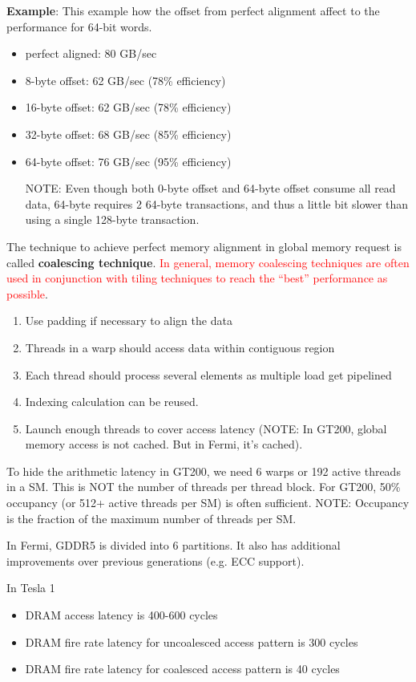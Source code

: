 {\bf Example}: This example how the offset from perfect alignment
affect to the performance for 64-bit words.
\begin{itemize}
\item perfect aligned: 80 GB/sec
\item 8-byte offset: 62 GB/sec (78\% efficiency)
\item 16-byte offset: 62 GB/sec (78\% efficiency)
\item 32-byte offset: 68 GB/sec (85\% efficiency)
\item 64-byte offset: 76 GB/sec (95\% efficiency)

  NOTE: Even though both 0-byte offset and 64-byte offset consume all
  read data, 64-byte requires 2 64-byte transactions, and thus a little bit
  slower than using a single 128-byte transaction.
\end{itemize}

The technique to achieve perfect memory alignment in global memory
request is called {\bf coalescing technique}.
\textcolor{red}{In general, memory coalescing techniques are often
  used in conjunction with tiling techniques to reach the ``best''
  performance as possible}.
\begin{enumerate}
\item Use padding if necessary to align the data
\item Threads in a warp should access data within contiguous region
\item Each thread should process several elements as multiple load get
  pipelined
\item Indexing calculation can be reused. 
\item Launch enough threads to cover access latency (NOTE: In GT200,
  global memory access is not cached. But in Fermi, it's cached). 
\end{enumerate}


To hide the arithmetic latency in GT200, we need 6 warps or 192 active
threads in a SM. This is NOT the number of threads per thread
block. For GT200, 50\% occupancy (or 512+ active threads per SM) is
often sufficient. NOTE: Occupancy is the fraction of the maximum
number of threads per SM.

In Fermi, GDDR5 is divided into 6 partitions. It also has additional
improvements over previous generations (e.g. ECC support). 

In Tesla 1
\begin{itemize}
\item DRAM access latency is 400-600 cycles
\item DRAM fire rate latency for uncoalesced access pattern is 300
  cycles
\item DRAM fire rate latency for coalesced access pattern is 40 cycles
\end{itemize}

